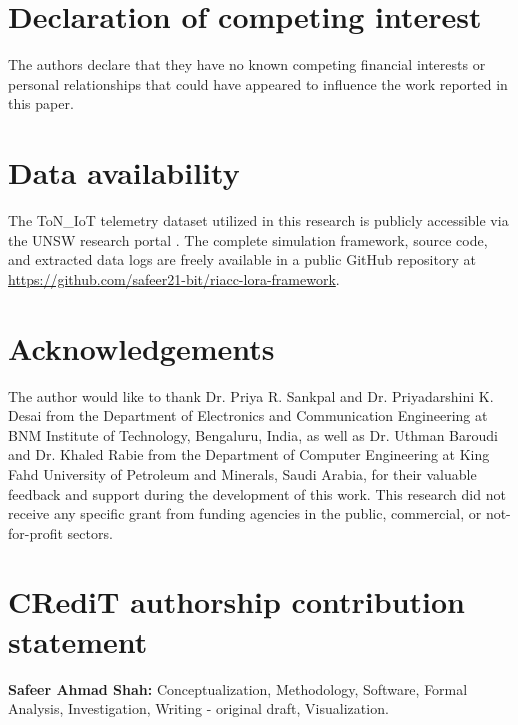 \documentclass[preprint,review,12pt]{elsarticle}
\begin{document}
\section*{Declaration of competing interest}
The authors declare that they have no known competing financial interests or personal relationships that could have appeared to influence the work reported in this paper.

\section*{Data availability}
The ToN\_IoT telemetry dataset utilized in this research is publicly accessible via the UNSW research portal \cite{alhawawreh2020toniot}. The complete simulation framework, source code, and extracted data logs are freely available in a public GitHub repository at \url{https://github.com/safeer21-bit/riacc-lora-framework}.

\section*{Acknowledgements}
The author would like to thank Dr. Priya R. Sankpal and Dr. Priyadarshini K. Desai from the Department of Electronics and Communication Engineering at BNM Institute of Technology, Bengaluru, India, as well as Dr. Uthman Baroudi and Dr. Khaled Rabie from the Department of Computer Engineering at King Fahd University of Petroleum and Minerals, Saudi Arabia, for their valuable feedback and support during the development of this work. This research did not receive any specific grant from funding agencies in the public, commercial, or not-for-profit sectors.

\section*{CRediT authorship contribution statement}
\textbf{Safeer Ahmad Shah:} Conceptualization, Methodology, Software, Formal Analysis, Investigation, Writing - original draft, Visualization.
\end{document}
